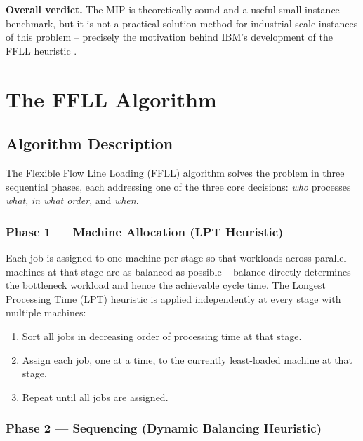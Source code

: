 \documentclass[11pt,a4paper]{article}
\begin{document}
\noindent \textbf{Overall verdict.} The MIP is theoretically sound and a
useful small-instance benchmark, but it is not a practical solution method
for industrial-scale instances of this problem -- precisely the motivation
behind IBM's development of the FFLL heuristic \citep{ibm_ffll}.

\section{The FFLL Algorithm}

\subsection{Algorithm Description}

The Flexible Flow Line Loading (FFLL) algorithm \citep{ibm_ffll,
pinedo2016scheduling} solves the problem in three sequential phases, each
addressing one of the three core decisions: \emph{who} processes \emph{what},
\emph{in what order}, and \emph{when}.

\subsubsection*{Phase 1 --- Machine Allocation (LPT Heuristic)}

Each job is assigned to one machine per stage so that workloads across
parallel machines at that stage are as balanced as possible -- balance
directly determines the bottleneck workload and hence the achievable cycle
time. The Longest Processing Time (LPT) heuristic \citep{graham1969bounds}
is applied independently at every stage with multiple machines:

\begin{enumerate}
  \item Sort all jobs in decreasing order of processing time at that stage.
  \item Assign each job, one at a time, to the currently least-loaded
    machine at that stage.
  \item Repeat until all jobs are assigned.
\end{enumerate}

\subsubsection*{Phase 2 --- Sequencing (Dynamic Balancing Heuristic)}
\end{document}
